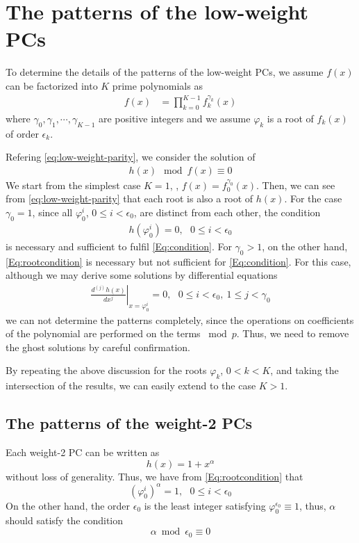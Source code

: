 \section{The patterns of the low-weight PCs}
\label{sec3}
To determine the details of the patterns of the low-weight PCs, we assume $f(x)$ can be factorized into $K$ prime polynomials as 
\begin{align}
f(x)&=\prod_{k=0}^{K-1}f_k^{\gamma_k}(x)
\end{align}
where $\gamma_0,\gamma_1,\cdots,\gamma_{K-1}$ are positive integers and we assume $\varphi_k$ is a root of $f_{k}(x)$ of order $\epsilon_k$.

Refering \eqref{eq:low-weight-parity}, we consider the solution of
\begin{align}
	h(x) \mod f(x) \equiv 0
	\label{Eq:condition}
\end{align}
%
We start from the simplest case $K=1$, \ie, $f(x) = f_0^{\gamma_0}(x)$. Then, we can see from \eqref{eq:low-weight-parity} that each root is also a root of $h(x)$. For the case $\gamma_0 = 1$, since all $\varphi_0^i$, $0 \leq i < \epsilon_0$, are distinct from each other, the condition
\begin{align}
	h(\varphi_0^i)=0,~~~ 0 \leq i < \epsilon_0
	\label{Eq:rootcondition}
\end{align}
is necessary and sufficient to fulfil \eqref{Eq:condition}. For $\gamma_0 > 1$, on the other hand, \eqref{Eq:rootcondition} is necessary but not sufficient for \eqref{Eq:condition}. For this case, although we may derive some solutions by differential equations
\begin{align}
\left.\frac{d^{(j)}h(x)}{d x^j}\right|_{x=\varphi_0^i}=0,~~~0 \leq i < \epsilon_0,~1 \leq j < \gamma_0
\label{Eq:differential}
\end{align}
we can not determine the patterns completely, since the operations on coefficients of the polynomial are performed on the terms $\bmod p$. Thus, we need to remove the ghost solutions 
by careful confirmation.

By repeating the above discussion for the roots $\varphi_k$, $0 < k < K$, and taking the intersection of the results, we can easily extend to the case $K>1$.

\subsection{The patterns of the weight-2 PCs}
\label{sec:PC2}
Each weight-2 PC can be written as 
\begin{equation}
h(x)=1+x^{\alpha}
\label{eq:wt2-gen-form}
\end{equation}
without loss of generality. Thus, we have from \eqref{Eq:rootcondition} that
\begin{equation}
(\varphi_0^i)^{\alpha} =1,~~~ 0 \leq i < \epsilon_0
\label{novelEq5b}
\end{equation}
On the other hand, the order $\epsilon_0$ is the least integer satisfying $\varphi_0^{\epsilon_0} \equiv 1$, thus, $\alpha$ should satisfy the condition
\begin{equation}
\alpha \bmod \epsilon_0  \equiv 0 
\label{eq:wt2-alpha}
\end{equation}

